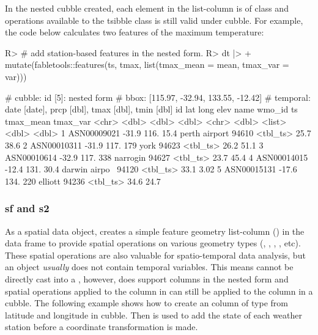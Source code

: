 \documentclass[
]{jss}
\begin{document}
In the nested cubble created, each element in the list-column  is of  class and operations available to the tsibble class is still valid under cubble. For example, the code below calculates two features of the maximum temperature:

\begin{CodeChunk}
\begin{CodeInput}
R> # add station-based features in the nested form.
R> dt |>
+   mutate(fabletools::features(ts, tmax, list(tmax_mean = mean, tmax_var = var)))
\end{CodeInput}
\begin{CodeOutput}
# cubble:   id [5]: nested form
# bbox:     [115.97, -32.94, 133.55, -12.42]
# temporal: date [date], prcp [dbl], tmax [dbl], tmin [dbl]
  id            lat  long  elev name          wmo_id ts       tmax_mean tmax_var
  <chr>       <dbl> <dbl> <dbl> <chr>          <dbl> <list>       <dbl>    <dbl>
1 ASN00009021 -31.9  116.  15.4 perth airport  94610 <tbl_ts>      25.7    38.6 
2 ASN00010311 -31.9  117. 179   york           94623 <tbl_ts>      26.2    51.1 
3 ASN00010614 -32.9  117. 338   narrogin       94627 <tbl_ts>      23.7    45.4 
4 ASN00014015 -12.4  131.  30.4 darwin airpo~  94120 <tbl_ts>      33.1     3.02
5 ASN00015131 -17.6  134. 220   elliott        94236 <tbl_ts>      34.6    24.7 
\end{CodeOutput}
\end{CodeChunk}

\hypertarget{sf-and-s2}{%
\subsubsection{sf and s2}\label{sf-and-s2}}

As a spatial data object,  creates a simple feature geometry list-column () in the data frame to provide spatial operations on various geometry types (, , , , etc). These spatial operations are also valuable for spatio-temporal data analysis, but an  object \emph{usually} does not contain temporal variables. This means  cannot be directly cast into a , however,  does support  columns in the nested form and spatial operations applied to the  column in  can still be applied to the  column in a cubble. The following example shows how to create an  column of  type from latitude and longitude in cubble. Then  is used to add the state  of each weather station before a coordinate transformation is made.
\end{document}
